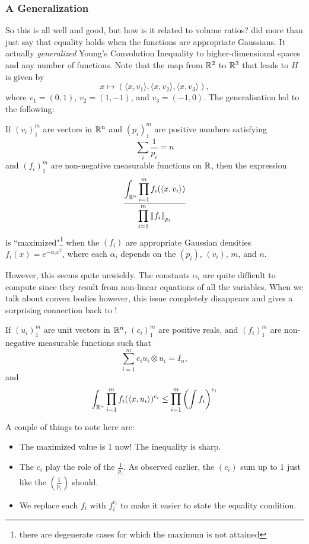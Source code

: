 \subsubsection{A Generalization}

So this is all well and good, but how is it related to volume ratios? \cite{BRASCAMP1976151} did more than just say that equality holds when the functions are appropriate Gaussians. It actually \textit{generalized} Young's Convolution Inequality to higher-dimensional spaces and any number of functions. Note that the map from $\mathbb{R}^2$ to $\mathbb{R}^3$ that leads to $H$ is given by
\[ x \mapsto (\langle x,v_1\rangle, \langle x,v_2\rangle, \langle x,v_3\rangle), \]
where $v_1 = (0,1)$, $v_2 = (1,-1)$, and $v_3 = (-1,0)$. The generalisation led to the following:
\begin{theorem}
If $(v_i)_1^m$ are vectors in $\mathbb{R}^n$ and $(p_i)_1^m$ are positive numbers satisfying
\[ \sum_i \frac{1}{p_i} = n \]
and $(f_i)_1^m$ are non-negative measurable functions on $\mathbb{R}$, then the expression
\[ \dfrac{\displaystyle\int_{\mathbb{R}^n} \displaystyle\prod_{i=1}^m f_i(\langle x,v_i\rangle) }{\displaystyle\prod_{i=1}^m \left\lVert f_i\right\rVert_{p_i}} \]
is ``maximized"\footnote{there are degenerate cases for which the maximum is not attained} when the $(f_i)$ are appropriate Gaussian densities $f_i(x) = e^{-\alpha_i x^2}$, where each $\alpha_i$ depends on the $(p_i)$, $(v_i)$, $m$, and $n$.
\end{theorem}

However, this seems quite unwieldy. The constants $\alpha_i$ are quite difficult to compute since they result from non-linear equations of all the variables. When we talk about convex bodies however, this issue completely disappears and gives a surprising connection back to !

\begin{ftheo}
\label{ball volume ratio estimate prereq}
If $(u_i)_1^m$ are unit vectors in $\mathbb{R}^n$, $(c_i)_1^m$ are positive reals, and $(f_i)_1^m$ are non-negative measurable functions such that
\[ \sum_{i=1}^m c_i u_i\otimes u_i = I_n, \]
and
\[ \int_{\mathbb{R}^n} \prod_{i=1}^m f_i(\langle x,u_i\rangle)^{c_i} \leq \prod_{i=1}^m \left(\int f_i\right)^{c_i} \]
\end{ftheo}

A couple of things to note here are:
\begin{itemize}
    \item The maximized value is $1$ now! The inequality is sharp.
    \item The $c_i$ play the role of the $\frac{1}{p_i}$. As observed earlier, the $(c_i)$ sum up to $1$ just like the $(\frac{1}{p_i})$ should.
    \item We replace each $f_i$ with $f_i^{c_i}$ to make it easier to state the equality condition.
\end{itemize}


